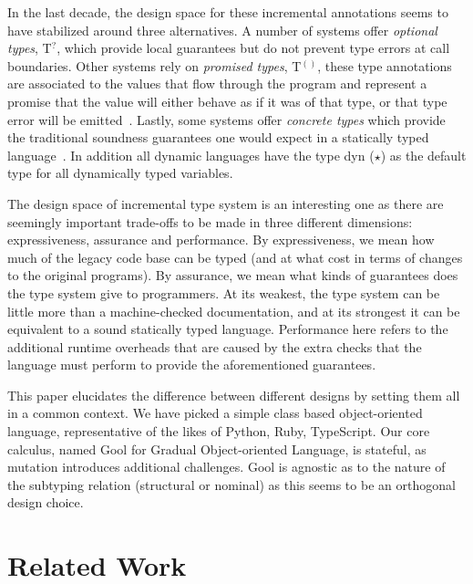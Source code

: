 \documentclass{sigplanconf}
\begin{document}
\newcommand{\Opt}[1]{#1$^{?}$\xspace}
\newcommand{\Con}[1]{#1$^{!}$\xspace}
\newcommand{\Pro}[1]{#1$^{()}$\xspace}
\newcommand{\dyn}{$\star$}

In the last decade, the design space for these incremental annotations seems
to have stabilized around three alternatives.  A number of systems offer
\emph{optional types}, \Opt{T},
\cite{PluggableTypes,Bracha93,typescript13,oopsla09} which provide local
guarantees but do not prevent type errors at call boundaries. Other systems
rely on \emph{promised types}, \Pro{T}, these type annotations are
associated to the values that flow through the program and represent a
promise that the value will either behave as if it was of that type, or that
type error will be emitted~\cite{siek14,tf-popl08}.  Lastly, some systems
offer \emph{concrete types} which provide the traditional soundness
guarantees one would expect in a statically typed
language~\cite{thorn,stongscript,csharp}. In addition all dynamic languages
have the type dyn (\dyn) as the default type for all dynamically typed
variables.

The design space of incremental type system is an interesting one as there
are seemingly important trade-offs to be made in three different dimensions:
expressiveness, assurance and performance.  By expressiveness, we mean how
much of the legacy code base can be typed (and at what cost in terms of
changes to the original programs).  By assurance, we mean what kinds of
guarantees does the type system give to programmers. At its weakest, the
type system can be little more than a machine-checked documentation, and at
its strongest it can be equivalent to a sound statically typed language.
Performance here refers to the additional runtime overheads that are caused
by the extra checks that the language must perform to provide the
aforementioned guarantees.

\newcommand{\name}{{\sf Gool}\xspace}

This paper elucidates the difference between different designs by setting
them all in a common context. We have picked a simple class based
object-oriented language, representative of the likes of Python, Ruby,
TypeScript. Our core calculus, named \name for Gradual Object-oriented
Language, is stateful, as mutation introduces additional challenges. \name
is agnostic as to the nature of the subtyping relation (structural or
nominal) as this seems to be an orthogonal design choice.

\section{Related Work}
\end{document}
